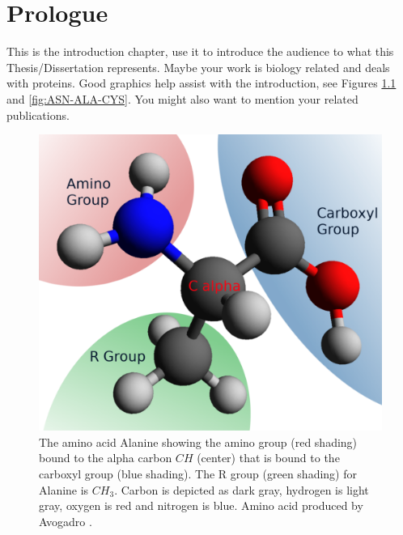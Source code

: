 \pagestyle{plain}
\chapter{Prologue} %
\renewcommand{\thetable}{\arabic{chapter}.\arabic{table}}  
\renewcommand{\thefigure}{\arabic{chapter}.\arabic{figure}} 

This is the introduction chapter, use it to introduce the audience to what this Thesis/Dissertation represents. Maybe your work is biology related and deals with proteins. Good graphics help assist with the introduction, see Figures \ref{fig:ala} and \ref{fig:ASN-ALA-CYS}. You might also want to mention your related publications.

\begin{figure}[h!]
\centering
\includegraphics[width=0.7\linewidth]{images/ALA2}
\caption{The amino acid Alanine showing the amino group (red shading) bound to the alpha carbon $CH$ (center) that is bound to the carboxyl group (blue shading). The R group (green shading)  for Alanine is $CH_3$. Carbon is depicted as dark gray, hydrogen is light gray, oxygen is red and nitrogen is blue. Amino acid produced by Avogadro \citep{Hanwell2012}.}
\label{fig:ala}
\end{figure}

